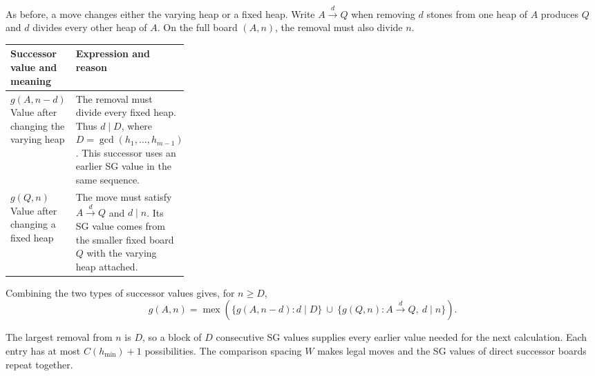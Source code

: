 \documentclass[10pt,a4paper]{article}
\DeclareMathOperator{\mex}{mex}
\begin{document}
As before, a move changes either the varying heap or a fixed heap.
Write $A\xrightarrow{d}Q$ when removing $d$ stones from one
heap of $A$ produces $Q$ and $d$ divides every other heap of $A$.
On the full board $(A,n)$, the removal must also divide $n$.

\begin{center}
\begin{tabularx}{\linewidth}{@{}L{0.30\linewidth}Y@{}}
\toprule
Successor value and meaning & Expression and reason \\
\midrule
$g(A,n-d)$\newline
Value after changing the varying heap
  & The removal must divide every fixed heap. Thus $d\mid D$,
    where $D=\gcd(h_1,\ldots,h_{m-1})$. This successor uses
    an earlier SG value in the same sequence. \\
\addlinespace[9pt]
$g(Q,n)$\newline
Value after changing a fixed heap
  & The move must satisfy $A\xrightarrow{d}Q$ and $d\mid n$.
    Its SG value comes from the smaller fixed board $Q$
    with the varying heap attached. \\
\bottomrule
\end{tabularx}
\end{center}

Combining the two types of successor values gives, for $n\ge D$,
\begin{equation}
 g(A,n)=\mex\left(
 \{g(A,n-d):d\mid D\}\ \cup\
 \{g(Q,n):A\xrightarrow{d}Q,\ d\mid n\}\right).
 \label{eq:periodrec}
\end{equation}

The largest removal from $n$ is $D$, so a block of $D$
consecutive SG values supplies every earlier value needed for
the next calculation. Each entry has at most $C(h_{\min})+1$
possibilities. The comparison spacing $W$ makes legal moves
and the SG values of direct successor boards repeat together.
\end{document}
